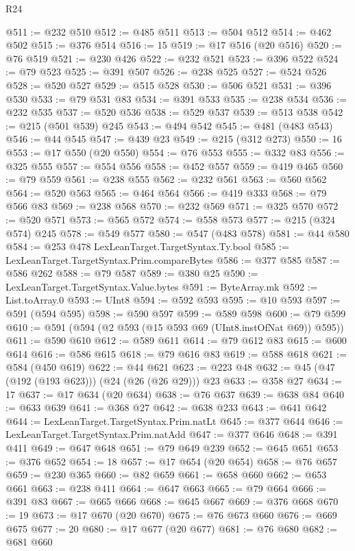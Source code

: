 \begin{lexlean}{R24}
\begin{coremodule}
@511 := @232 @510
@512 := @485 @511
@513 := @504 @512
@514 := @462 @502
@515 := @376 @514
@516 := 15
@519 := @17 @516 (@20 @516)
@520 := @76 @519
@521 := @230 @426
@522 := @232 @521
@523 := @396 @522
@524 := @79 @523
@525 := @391 @507
@526 := @238 @525
@527 := @524 @526
@528 := @520 @527
@529 := @515 @528
@530 := @506 @521
@531 := @396 @530
@533 := @79 @531 @83
@534 := @391 @533
@535 := @238 @534
@536 := @232 @535
@537 := @520 @536
@538 := @529 @537
@539 := @513 @538
@542 := @215 (@501 @539) @245
@543 := @494 @542
@545 := @481 (@483 @543)
@546 := @44 @545
@547 := @439 @23
@549 := @215 (@312 @273)
@550 := 16
@553 := @17 @550 (@20 @550)
@554 := @76 @553
@555 := @332 @83
@556 := @325 @555
@557 := @554 @556
@558 := @452 @557
@559 := @419 @465
@560 := @79 @559
@561 := @238 @555
@562 := @232 @561
@563 := @560 @562
@564 := @520 @563
@565 := @464 @564
@566 := @419 @333
@568 := @79 @566 @83
@569 := @238 @568
@570 := @232 @569
@571 := @325 @570
@572 := @520 @571
@573 := @565 @572
@574 := @558 @573
@577 := @215 (@324 @574) @245
@578 := @549 @577
@580 := @547 (@483 @578)
@581 := @44 @580
@584 := @253 @478 LexLeanTarget.TargetSyntax.Ty.bool
@585 := LexLeanTarget.TargetSyntax.Prim.compareBytes
@586 := @377 @585
@587 := @586 @262
@588 := @79 @587
@589 := @380 @25
@590 := LexLeanTarget.TargetSyntax.Value.bytes
@591 := ByteArray.mk
@592 := List.toArray.{0}
@593 := UInt8
@594 := @592 @593
@595 := @10 @593
@597 := @591 (@594 @595)
@598 := @590 @597
@599 := @589 @598
@600 := @79 @599
@610 := @591 (@594 (@2 @593 (@15 @593 @69 (UInt8.instOfNat @69)) @595))
@611 := @590 @610
@612 := @589 @611
@614 := @79 @612 @83
@615 := @600 @614
@616 := @586 @615
@618 := @79 @616 @83
@619 := @588 @618
@621 := @584 (@450 @619)
@622 := @44 @621
@623 := @223 @48
@632 := @45 (@47 (@192 (@193 @623))) (@24 (@26 (@26 @29))) @23
@633 := @358 @27
@634 := 17
@637 := @17 @634 (@20 @634)
@638 := @76 @637
@639 := @638 @84
@640 := @633 @639
@641 := @368 @27
@642 := @638 @233
@643 := @641 @642
@644 := LexLeanTarget.TargetSyntax.Prim.natLt
@645 := @377 @644
@646 := LexLeanTarget.TargetSyntax.Prim.natAdd
@647 := @377 @646
@648 := @391 @411
@649 := @647 @648
@651 := @79 @649 @239
@652 := @645 @651
@653 := @376 @652
@654 := 18
@657 := @17 @654 (@20 @654)
@658 := @76 @657
@659 := @230 @365
@660 := @82 @659
@661 := @658 @660
@662 := @653 @661
@663 := @238 @411
@664 := @647 @663
@665 := @79 @664
@666 := @391 @83
@667 := @665 @666
@668 := @645 @667
@669 := @376 @668
@670 := 19
@673 := @17 @670 (@20 @670)
@675 := @76 @673 @660
@676 := @669 @675
@677 := 20
@680 := @17 @677 (@20 @677)
@681 := @76 @680
@682 := @681 @660

\end{coremodule}
\end{lexlean}
